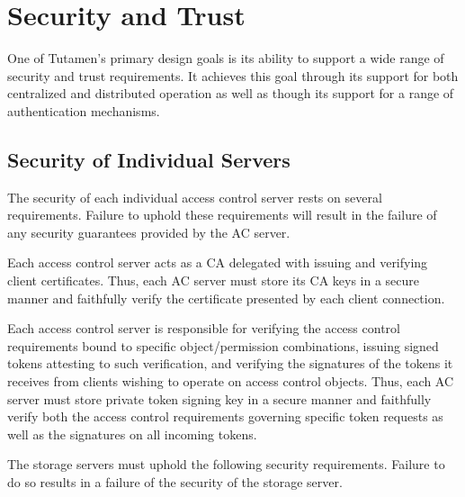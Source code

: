 \section{Security and Trust}
\label{sec:trust}

One of Tutamen's primary design goals is its ability to support a wide
range of security and trust requirements. It achieves this goal
through its support for both centralized and distributed operation as
well as though its support for a range of authentication mechanisms.

\subsection{Security of Individual Servers}

The security of each individual access control server rests on several
requirements. Failure to uphold these requirements will result in the
failure of any security guarantees provided by the AC server.

\begin{packed_desc}
\item[Certificate Authority Role:] Each access control server acts as
  a CA delegated with issuing and verifying client certificates. Thus,
  each AC server must store its CA keys in a secure manner and
  faithfully verify the certificate presented by each client
  connection.
\item[Token Issuance and Verification:] Each access control server is
  responsible for verifying the access control requirements bound to
  specific object/permission combinations, issuing signed tokens
  attesting to such verification, and verifying the signatures of the
  tokens it receives from clients wishing to operate on access control
  objects. Thus, each AC server must store private token signing key
  in a secure manner and faithfully verify both the access control
  requirements governing specific token requests as well as the
  signatures on all incoming tokens.
\end{packed_desc}

The storage servers must uphold the following security
requirements. Failure to do so results in a failure of the security of
the storage server.

